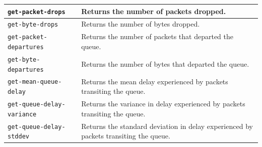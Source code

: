 \documentclass[11pt]{article}
\begin{document}
\begin{table}[ht]
\begin{center}
\begin{tabular}{|l|l|}
\verb|get-packet-drops| &
  \begin{minipage}[c]{3.5in}
  \vspace{0.05in}
  Returns the number of packets dropped.
  \vspace{0.05in}
  \end{minipage} \\ \hline

\verb|get-byte-drops| &
  \begin{minipage}[c]{3.5in}
  \vspace{0.05in}
  Returns the number of bytes dropped.
  \vspace{0.05in}
  \end{minipage} \\ \hline

\verb|get-packet-departures| &
  \begin{minipage}[c]{3.5in}
  \vspace{0.05in}
  Returns the number of packets that departed the queue.
  \vspace{0.05in}
  \end{minipage} \\ \hline

\verb|get-byte-departures| &
  \begin{minipage}[c]{3.5in}
  \vspace{0.05in}
  Returns the number of bytes that departed the queue.
  \vspace{0.05in}
  \end{minipage} \\ \hline

\verb|get-mean-queue-delay| &
  \begin{minipage}[c]{3.5in}
  \vspace{0.05in}
  Returns the mean delay experienced by packets transiting the queue.
  \vspace{0.05in}
  \end{minipage} \\ \hline

\verb|get-queue-delay-variance| &
  \begin{minipage}[c]{3.5in}
  \vspace{0.05in}
  Returns the variance in delay experienced by packets transiting 
  the queue.
  \vspace{0.05in}
  \end{minipage} \\ \hline

\verb|get-queue-delay-stddev| &
  \begin{minipage}[c]{3.5in}
  \vspace{0.05in}
  Returns the standard deviation in delay experienced by packets 
  transiting the queue.
  \vspace{0.05in}
  \end{minipage} \\ \hline


\end{tabular}
\end{center}
\end{table}
\end{document}

